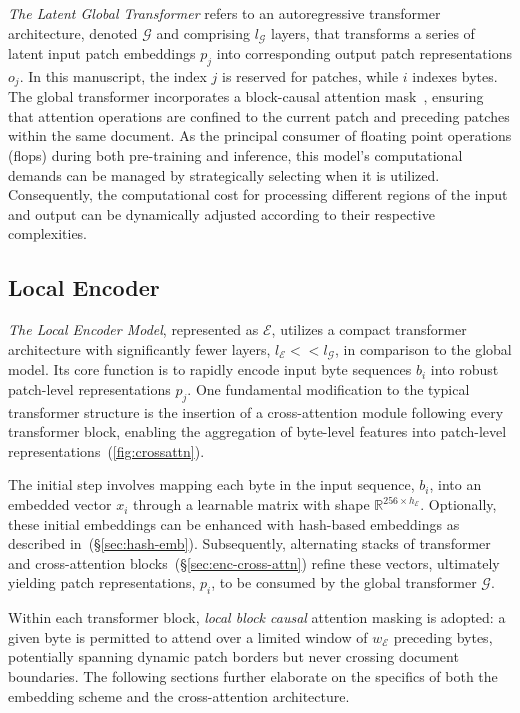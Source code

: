 \textit{The Latent Global Transformer} refers to an autoregressive transformer architecture, denoted $\mathcal{G}$ and comprising $l_{\mathcal{G}}$ layers, that transforms a series of latent input patch embeddings $p_j$ into corresponding output patch representations $o_j$. In this manuscript, the index $j$ is reserved for patches, while $i$ indexes bytes. The global transformer incorporates a block-causal attention mask~\citep{dubey2024llama}, ensuring that attention operations are confined to the current patch and preceding patches within the same document. As the principal consumer of floating point operations (flops) during both pre-training and inference, this model’s computational demands can be managed by strategically selecting when it is utilized. Consequently, the computational cost for processing different regions of the input and output can be dynamically adjusted according to their respective complexities.

\subsection{Local Encoder}
\label{section:local}

\textit{The Local Encoder Model}, represented as $\mathcal{E}$, utilizes a compact transformer architecture with significantly fewer layers, $l_{\mathcal{E}} << l_{\mathcal{G}}$, in comparison to the global model. Its core function is to rapidly encode input byte sequences $b_i$ into robust patch-level representations $p_j$. One fundamental modification to the typical transformer structure is the insertion of a cross-attention module following every transformer block, enabling the aggregation of byte-level features into patch-level representations~(\autoref{fig:crossattn}).

The initial step involves mapping each byte in the input sequence, $b_i$, into an embedded vector $x_i$ through a learnable matrix with shape $\mathbb{R}^{256 \times h_{\mathcal{E}}}$. Optionally, these initial embeddings can be enhanced with hash-based embeddings as described in~(\S\ref{sec:hash-emb}). Subsequently, alternating stacks of transformer and cross-attention blocks~(\S\ref{sec:enc-cross-attn}) refine these vectors, ultimately yielding patch representations, $p_i$, to be consumed by the global transformer $\mathcal{G}$.

Within each transformer block, \textit{local block causal} attention masking is adopted: a given byte is permitted to attend over a limited window of $w_{\mathcal{E}}$ preceding bytes, potentially spanning dynamic patch borders but never crossing document boundaries. The following sections further elaborate on the specifics of both the embedding scheme and the cross-attention architecture.

